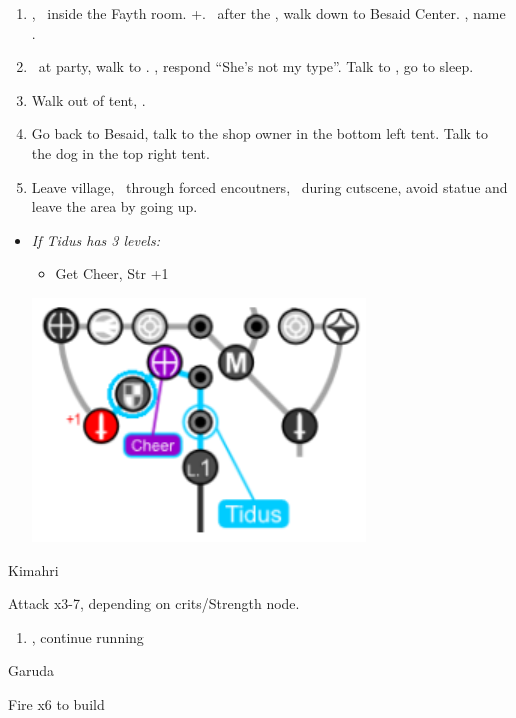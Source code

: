 \begin{enumerate}[resume]
  \item \cs[1:00], \sd\ inside the Fayth room. \fmv+\cs[1:00]. \sd\ after the \fmv, walk down to Besaid Center. \cs[1:40], name \valefor.
  \item \sd\ at party, walk to \yuna. \sd, respond ``She's not my type''. Talk to \wakka, go to sleep.
  \item Walk out of tent, \sd.
  \item Go back to Besaid, talk to the shop owner in the bottom left tent. Talk to the dog in the top right tent.
  \item Leave village, \sd\ through forced encoutners, \sd\ during cutscene, avoid statue and leave the area by going up.
\end{enumerate}
\begin{spheregrid}
  \begin{itemize}
    \item \textit{If Tidus has 3 levels:}
          \begin{itemize}
            \item Get Cheer, Str +1
          \end{itemize}
          \includegraphics{graphics/tiduscheer}
  \end{itemize}
\end{spheregrid}
\begin{battle}[750]{Kimahri}
  \begin{itemize}
    \tidusf Attack x3-7, depending on crits/Strength node.
  \end{itemize}
\end{battle}
\begin{enumerate}[resume]
  \item \sd, continue running
\end{enumerate}
\begin{battle}{Garuda}
  \begin{itemize}
    \summon{\valefor}
    \valeforf Fire x6 to build \od
  \end{itemize}
\end{battle}
